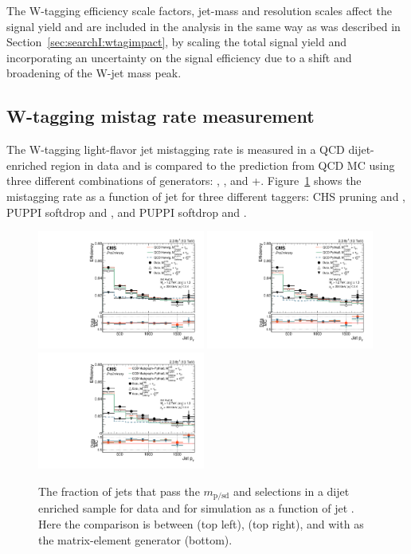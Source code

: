 The W-tagging efficiency scale factors, jet-mass and resolution scales affect the signal yield and are included in the analysis in the same way as was described in Section~\ref{sec:searchI:wtagimpact}, by scaling the total signal yield and incorporating an uncertainty on the signal efficiency due to a shift and broadening of the W-jet mass peak.

\subsection{W-tagging mistag rate measurement} 
\label{sec:searchII:wmistag}
The W-tagging light-flavor jet mistagging rate is measured in a QCD dijet-enriched region in data and is compared to the prediction from QCD MC using three different combinations of generators: \HERWIG{++}, , and \MADGRAPH{}+.
Figure~\ref{fig:searchII:fakerate} shows the mistagging rate as a function of jet \PT for three different taggers: CHS pruning and \nsubj, PUPPI softdrop and \nsubj, and PUPPI softdrop and \ddt.
\begin{figure}[h!]
\centering
\includegraphics[width=0.49\textwidth]{figures/vtagging/JME-16-003/BoostedW/BkgEff_DataMC_herwig_pT.pdf}
\includegraphics[width=0.49\textwidth]{figures/vtagging/JME-16-003/BoostedW/BkgEff_DataMC_Pythia8_pT.pdf}\\
\includegraphics[width=0.49\textwidth]{figures/vtagging/JME-16-003/BoostedW/BkgEff_DataMC_Pythia8Madgraph_pT.pdf}
\caption{ 
The fraction of jets that pass the $m_{\mathrm{p/sd}}$ and \nsubj selections in a dijet enriched sample for data and for simulation as a function of jet \PT. Here the comparison is between \HERWIG{++} (top left),  (top right), and  with \MADGRAPH as the matrix-element generator (bottom).}
\label{fig:searchII:fakerate}
\end{figure}
